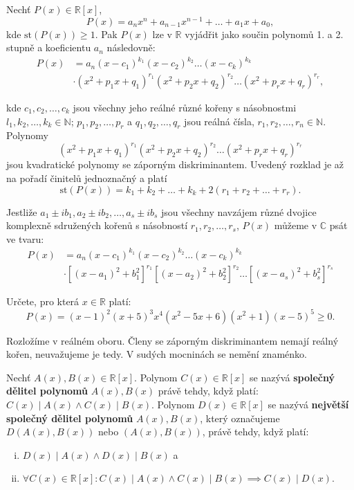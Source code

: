 \begin{veta}
  Nechť $P(x) \in \mathbb R [x]$,
  $$P(x) = a_n x^n + a_{n-1} x^{n-1} + \dots + a_1 x + a_0,$$
  kde $\textrm{st}(P(x)) \geq 1$. Pak $P(x)$ lze v $\mathbb R$ vyjádřit jako součin polynomů 1. a 2. stupně a koeficientu $a_n$ následovně:
  \begin{align*}
    P(x) & = a_n(x-c_1)^{k_1}(x-c_2)^{k_2} \dots (x-c_k)^{k_k}\\
    & \cdot (x^2+p_1 x + q_1)^{r_1}(x^2+p_2 x + q_2)^{r_2} \dots (x^2+p_r x + q_r)^{r_r},
  \end{align*}


  kde $c_1,c_2, \dots, c_k$ jsou všechny jeho reálné různé kořeny s násobnostmi $l_1, k_2, \dots, k_k \in \mathbb N$;
  $p_1, p_2, \dots, p_r$ a $q_1, q_2, \dots, q_r$ jsou reálná čísla, $r_1, r_2, \dots, r_n \in \mathbb N$.
  Polynomy
  $$(x^2+p_1 x + q_1)^{r_1}(x^2+p_2 x + q_2)^{r_2} \dots (x^2+p_r x + q_r)^{r_r}$$
  jsou kvadratické polynomy se záporným diskriminantem. Uvedený rozklad je až na pořadí činitelů
  jednoznačný a platí
  $$\textrm{st}(P(x)) = k_1 + k_2 + \dots + k_k + 2(r_1 + r_2 + \dots + r_r).$$

  Jestliže $a_1 \pm ib_1, a_2 \pm ib_2, \dots, a_s \pm ib_s$ jsou všechny navzájem různé
  dvojice komplexně sdružených kořenů s násobností $r_1, r_2, \dots, r_s$, $P(x)$ můžeme v $\mathbb C$ psát ve tvaru:
  \begin{align*}
    P(x) & = a_n(x-c_1)^{k_1}(x-c_2)^{k_2} \dots (x-c_k)^{k_k}\\
    & \cdot  \left [(x-a_1)^2+b_1^2\right ]^{r_1}\left [(x-a_2)^2+b_2^2\right]^{r_2} \dots \left [(x-a_s)^2+b_s^2\right ]^{r_s}
  \end{align*}
\end{veta}

\begin{priklad}
    Určete, pro která $x \in \mathbb R$ platí:
    $$P(x)=(x-1)^2(x+5)^3x^4(x^2-5x+6)(x^2+1)(x-5)^5 \geq 0.$$
\end{priklad}

\begin{reseni}
Rozložíme v reálném oboru. Členy se záporným diskriminantem nemají reálný kořen,
neuvažujeme je tedy. V sudých mocninách se nemění znaménko.
\end{reseni}

\begin{definition}
  Nechť $A(x), B(x) \in \mathbb R [x]$. Polynom $C(x) \in \mathbb R [x]$ se nazývá \textbf{společný dělitel polynomů} $A(x), B(x)$
  právě tehdy, když platí: $C(x) \mid A(x) \land C(x) \mid B(x)$.
  Polynom $D(x) \in \mathbb R [x]$ se nazývá \textbf{největší společný dělitel polynomů} $A(x), B(x)$, který označujeme $D(A(x), B(x))$ nebo $(A(x), B(x))$, právě tehdy, když platí:
  \begin{enumerate}[i.]
    \item $D(x) \mid A(x) \land D(x) \mid B(x)$ a
    \item $\forall C(x) \in \mathbb R [x]: C(x) \mid A(x) \land C(x) \mid B(x) \implies C(x) \mid D(x).$
  \end{enumerate}
\end{definition}

